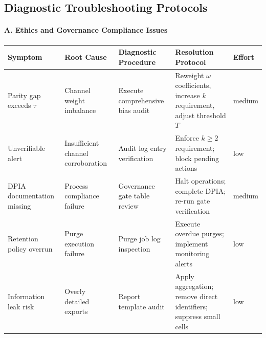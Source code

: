 \documentclass[12pt]{article}
\theoremstyle{plain}
\begin{document}
\subsection{Diagnostic Troubleshooting Protocols}
\paragraph{A. Ethics and Governance Compliance Issues}
\begin{center}
\small
\begin{tabular}{p{3.6cm} p{4.2cm} p{3.6cm} p{4.2cm} p{1.4cm}}
\toprule
\textbf{Symptom} & \textbf{Root Cause} & \textbf{Diagnostic Procedure} & \textbf{Resolution Protocol} & \textbf{Effort}\\
\midrule
Parity gap exceeds $\tau$ & Channel weight imbalance & Execute comprehensive bias audit & Reweight $\omega$ coefficients, increase $k$ requirement, adjust threshold $T$ & medium\\
Unverifiable alert & Insufficient channel corroboration & Audit log entry verification & Enforce $k\!\ge\!2$ requirement; block pending actions & low\\
DPIA documentation missing & Process compliance failure & Governance gate table review & Halt operations; complete DPIA; re-run gate verification & medium\\
Retention policy overrun & Purge execution failure & Purge job log inspection & Execute overdue purges; implement monitoring alerts & low\\
Information leak risk & Overly detailed exports & Report template audit & Apply aggregation; remove direct identifiers; suppress small cells & low\\
\bottomrule
\end{tabular}
\end{center}
\end{document}
